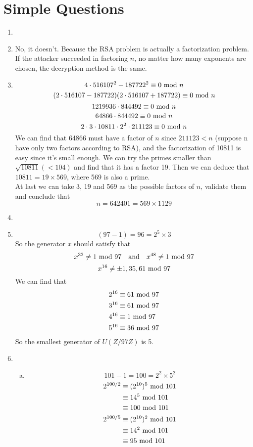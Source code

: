 \documentclass{article}
\renewcommand{\mod}{{\rm\ mod\ }}
\begin{document}
\section{Simple Questions}
\begin{enumerate}
\item


\item
No, it doesn't. Because the RSA problem is actually a factorization problem. If the attacker succeeded in factoring $n$, no matter how many exponents are chosen, the decryption method is the same.

\item
$$4\cdot516107^2-187722^2\equiv0\mod n$$
$$(2\cdot516107-187722)(2\cdot516107+187722)\equiv0\mod n$$
$$1219936\cdot844492\equiv0\mod n$$
$$64866\cdot844492\equiv0\mod n$$
$$2\cdot3\cdot10811\cdot2^2\cdot211123\equiv0\mod n$$
We can find that 64866 must have a factor of $n$ since $211123<n$ (suppose n have only two factors according to RSA), and the factorization of 10811 is easy since it's small enough. We can try the primes smaller than $\sqrt{10811}(<104)$ and find that it has a factor 19. Then we can deduce that $10811=19\times569$, where 569 is also a prime.\\

At last we can take 3, 19 and 569 as the possible factors of $n$,  validate them and conclude that
$$n=642401=569\times1129$$
\item


\item
$$(97-1)=96=2^5\times3$$
So the generator $x$ should satisfy that 
$$x^{32}\neq 1\mod 97\quad{\rm and}\quad x^{48}\neq 1\mod 97$$
$$x^{16}\neq \pm 1,35,61\mod 97$$
We can find that
\begin{align*}
2^{16}&\equiv61\mod97\\
3^{16}&\equiv61\mod97\\
4^{16}&\equiv1\mod97\\
5^{16}&\equiv36\mod97
\end{align*}
So the smallest generator of $U(Z/97Z)$ is 5.

\item
\begin{enumerate}[(a)]
\item
$$101-1=100=2^2\times5^2$$
\begin{align*}
2^{100/2}&\equiv(2^{10})^5\mod 101\\
&\equiv14^5\mod 101\\
&\equiv100\mod 101\\
2^{100/5}&\equiv(2^{10})^2\mod 101\\
&\equiv14^2\mod 101\\
&\equiv95\mod 101
\end{align*}


\end{enumerate}
\end{enumerate}
\end{document}
